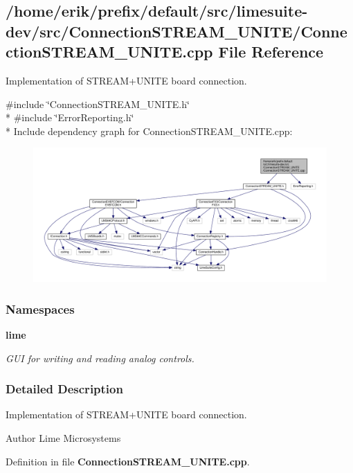 \subsection{/home/erik/prefix/default/src/limesuite-\/dev/src/\+Connection\+S\+T\+R\+E\+A\+M\+\_\+\+U\+N\+I\+T\+E/\+Connection\+S\+T\+R\+E\+A\+M\+\_\+\+U\+N\+I\+TE.cpp File Reference}
\label{ConnectionSTREAM__UNITE_8cpp}


Implementation of S\+T\+R\+E\+A\+M+\+U\+N\+I\+TE board connection.  


{\ttfamily \#include \char`\"{}Connection\+S\+T\+R\+E\+A\+M\+\_\+\+U\+N\+I\+T\+E.\+h\char`\"{}}\\*
{\ttfamily \#include \char`\"{}Error\+Reporting.\+h\char`\"{}}\\*
Include dependency graph for Connection\+S\+T\+R\+E\+A\+M\+\_\+\+U\+N\+I\+T\+E.\+cpp\+:
\nopagebreak
\begin{figure}[H]
\begin{center}
\leavevmode
\includegraphics[width=350pt]{d4/d0e/ConnectionSTREAM__UNITE_8cpp__incl}
\end{center}
\end{figure}
\subsubsection*{Namespaces}
\begin{DoxyCompactItemize}
\item 
 {\bf lime}
\begin{DoxyCompactList}\small\item\em G\+UI for writing and reading analog controls. \end{DoxyCompactList}\end{DoxyCompactItemize}


\subsubsection{Detailed Description}
Implementation of S\+T\+R\+E\+A\+M+\+U\+N\+I\+TE board connection. 

\begin{DoxyAuthor}{Author}
Lime Microsystems 
\end{DoxyAuthor}


Definition in file {\bf Connection\+S\+T\+R\+E\+A\+M\+\_\+\+U\+N\+I\+T\+E.\+cpp}.

